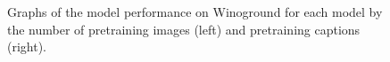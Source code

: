 \begin{figure}[ht]
    \centering
    \caption{Graphs of the model performance on Winoground for each model by the number of pretraining images (left) and pretraining captions (right).}
    \label{fig:pretraining_images_ours}
\end{figure}